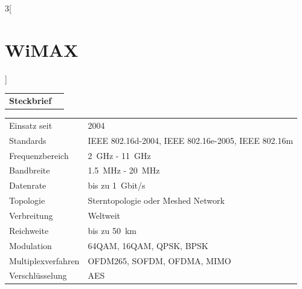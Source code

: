 \begin{multicols}{3}[\section{WiMAX}]


\newrefsegment

\begin{tabular}{p{}p{2.7 cm}}
\textbf{Steckbrief}& \\
\end{tabular}
\begin{tabular}{p{}p{2.7 cm}}
      Einsatz seit & 2004\\
      Standards & IEEE 802.16d-2004, IEEE 802.16e-2005, IEEE 802.16m\\
      Frequenzbereich  & \SI{2}{\giga\hertz} - \SI{11}{\giga\hertz}\\
      Bandbreite & \SI{1,5}{\mega\hertz} - \SI{20}{\mega\hertz}\\
      Datenrate & bis zu \SI{1}{Gbit/s}\\
      Topologie & Sterntopologie oder Meshed Network\\
      Verbreitung & Weltweit\\
      Reichweite & bis zu \SI{50}{\kilo\metre}\\
      Modulation & 64QAM, 16QAM, QPSK, BPSK\\
      Multiplexverfahren & OFDM265, SOFDM, OFDMA, MIMO\\
      Verschlüsselung & AES\\
\end{tabular}
\par

\end{multicols}
